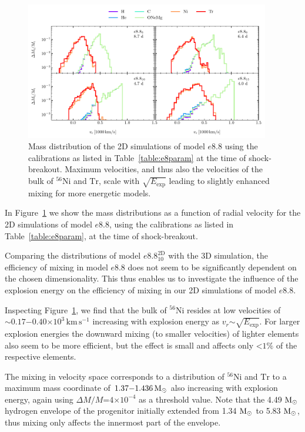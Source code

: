 \documentclass[fleqn,usenatbib]{mnras}
\newcommand{\nickel}{\ensuremath{\mathrm{^{56}Ni}}\xspace}
\newcommand{\tracer}{\ensuremath{\mathrm{Tr}}\xspace}
\newcommand{\solm}{\ensuremath{\rm{M_{\odot}}}\xspace}
\newcommand{\kms}{\ensuremath{\mathrm{km\, s^{-1}}}}
\begin{document}
\begin{figure}%
 \centering
 \includegraphics[width=0.95\textwidth]{pic/e8_2d_all_sbo_massdis_velocity.pdf}
 \caption{Mass distribution of the 2D simulations of model $e8.8$ using the calibrations as listed in Table~\ref{table:e8param} at the time of shock-breakout. Maximum velocities, and thus also the velocities of the bulk of \nickel and \tracer, scale with $\sqrt{E_{\mathrm{exp}}}$ leading to slightly enhanced mixing for more energetic models. }
 \label{fig:e8 2d massDis sbo}
\end{figure}
In Figure~\ref{fig:e8 2d massDis sbo} we show the mass distributions as a function of radial velocity for the 2D simulations of model $e8.8$, using the calibrations as listed in Table~\ref{table:e8param}, at the time of shock-breakout. 

Comparing the distributions of model $e8.8_{10}^{\mathrm{2D}}$ with the 3D simulation, the efficiency of mixing in model $e8.8$ does not seem to be significantly dependent on the chosen dimensionality. This thus enables us to investigate the influence of the explosion energy on the efficiency of mixing in our 2D simulations of model $e8.8$.
 
Inspecting Figure~\ref{fig:e8 2d massDis sbo}, we find that the bulk of \nickel resides at low velocities of $\mathord{\sim}0.17\mathord{-}0.40\mathord{\times}10^3\,\kms$ increasing with explosion energy as $v_{r}\mathord{\sim}\sqrt{E_{\mathrm{exp}}}$. 
For larger explosion energies the downward mixing (to smaller velocities) of lighter elements also seem to be more efficient, but the effect is small and affects only $\mathord{<}1\%$ of the respective elements. 

The mixing in velocity space corresponds to a distribution of \nickel and \tracer to a maximum mass coordinate of $1.37\mathord{-}1.436\,\solm$ also increasing with explosion energy, again using $\Delta M/M\mathord{=}4\mathord{\times}10^{-4}$ as a threshold value. Note that the 4.49 \solm hydrogen envelope of the progenitor initially extended from 1.34 \solm to 5.83 \solm, thus mixing only affects the innermost part of the envelope.
\end{document}
